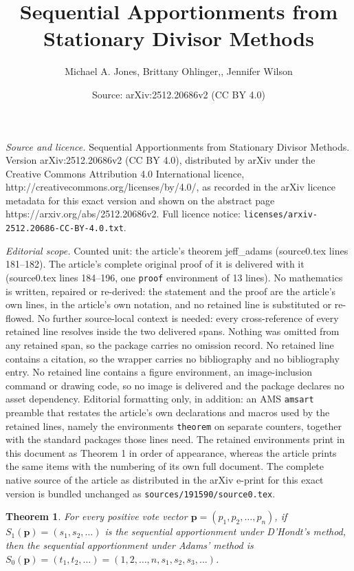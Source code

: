 \documentclass[10pt,a4paper]{amsart}
\title{Sequential Apportionments from Stationary Divisor Methods}
\author{Michael A. Jones, Brittany Ohlinger,, Jennifer Wilson}
\date{Source: arXiv:2512.20686v2 (CC BY 4.0)}
\newtheorem{theorem}{Theorem}
\begin{document}
\maketitle

\noindent\emph{Source and licence.} Sequential Apportionments from Stationary Divisor Methods. Version arXiv:2512.20686v2 (CC BY 4.0), distributed by arXiv under the Creative Commons Attribution 4.0 International licence, http://creativecommons.org/licenses/by/4.0/, as recorded in the arXiv licence metadata for this exact version and shown on the abstract page https://arxiv.org/abs/2512.20686v2. Full licence notice: \texttt{licenses/arxiv-2512.20686-CC-BY-4.0.txt}.\par\smallskip

\noindent\textit{Editorial scope.} Counted unit: the article's theorem jeff\_adams (source0.tex lines 181--182). The article's complete original proof of it is delivered with it (source0.tex lines 184--196, one \texttt{proof} environment of 13 lines). No mathematics is written, repaired or re-derived: the statement and the proof are the article's own lines, in the article's own notation, and no retained line is substituted or re-flowed.  No further source-local context is needed: every cross-reference of every retained line resolves inside the two delivered spans.  Nothing was omitted from any retained span, so the package carries no omission record.  No retained line contains a citation, so the wrapper carries no bibliography and no bibliography entry.  No retained line contains a figure environment, an image-inclusion command or drawing code, so no image is delivered and the package declares no asset dependency.  Editorial formatting only, in addition: an AMS \texttt{amsart} preamble that restates the article's own declarations and macros used by the retained lines, namely the environments \texttt{theorem} on separate counters, together with the standard packages those lines need.  The retained environments print in this document as Theorem 1 in order of appearance, whereas the article prints the same items with the numbering of its own full document.  The complete native source of the article as distributed in the arXiv e-print for this exact version is bundled unchanged as \texttt{sources/191590/source0.tex}.
\begin{theorem}\label{jeff_adams}
For every positive vote vector $\mathbf p = (p_1, p_2, \ldots, p_n)$, if $S_1(\mathbf p) = (s_1, s_2, \dots)$ is the sequential apportionment under D'Hondt's method, then the sequential apportionment under Adams' method is $S_0(\mathbf p) = (t_1, t_2, \dots) = (1, 2, \dots, n, s_1, s_2, s_3, \dots)$.  \end{theorem}
\end{document}
